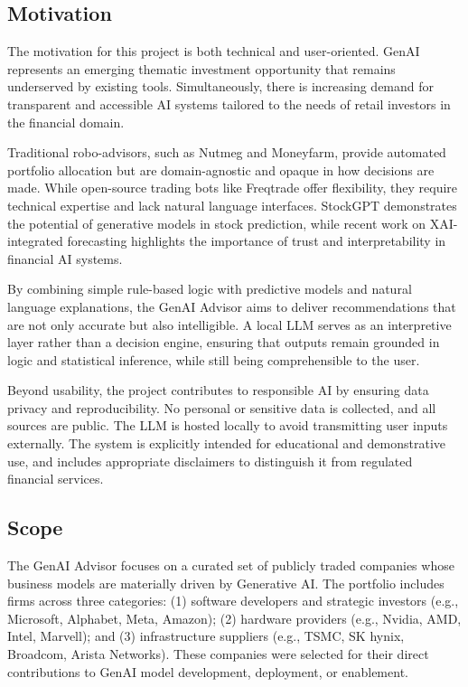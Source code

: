 \subsection{Motivation}

The motivation for this project is both technical and user-oriented. GenAI represents an emerging thematic investment opportunity that remains underserved by existing tools. Simultaneously, there is increasing demand for transparent and accessible AI systems tailored to the needs of retail investors in the financial domain.

Traditional robo-advisors, such as Nutmeg and Moneyfarm, provide automated portfolio allocation but are domain-agnostic and opaque in how decisions are made. While open-source trading bots like Freqtrade offer flexibility, they require technical expertise and lack natural language interfaces. StockGPT \cite{mai2024stockgpt} demonstrates the potential of generative models in stock prediction, while recent work on XAI-integrated forecasting \cite{marey2024xai} highlights the importance of trust and interpretability in financial AI systems.

By combining simple rule-based logic with predictive models and natural language explanations, the GenAI Advisor aims to deliver recommendations that are not only accurate but also intelligible. A local LLM serves as an interpretive layer rather than a decision engine, ensuring that outputs remain grounded in logic and statistical inference, while still being comprehensible to the user.

Beyond usability, the project contributes to responsible AI by ensuring data privacy and reproducibility. No personal or sensitive data is collected, and all sources are public. The LLM is hosted locally to avoid transmitting user inputs externally. The system is explicitly intended for educational and demonstrative use, and includes appropriate disclaimers to distinguish it from regulated financial services.

\subsection{Scope}
\label{sec:scope}

The GenAI Advisor focuses on a curated set of publicly traded companies whose business models are materially driven by Generative AI. The portfolio includes firms across three categories: (1) software developers and strategic investors (e.g., Microsoft, Alphabet, Meta, Amazon); (2) hardware providers (e.g., Nvidia, AMD, Intel, Marvell); and (3) infrastructure suppliers (e.g., TSMC, SK hynix, Broadcom, Arista Networks). These companies were selected for their direct contributions to GenAI model development, deployment, or enablement.

